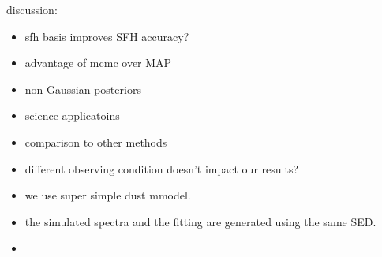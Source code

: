 discussion: 
\begin{itemize}
    \item sfh basis improves SFH accuracy? 
    \item advantage of mcmc over MAP
    \item non-Gaussian posteriors
    \item science applicatoins 
    \item comparison to other methods 
    \item different observing condition doesn't impact our results? 
    \item we use super simple dust mmodel.  
    \item the simulated spectra and the fitting are generated using the same
        SED. 
    \item {}
\end{itemize}

